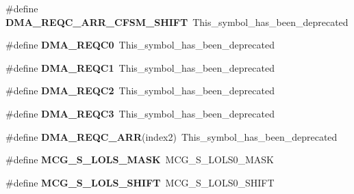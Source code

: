 \begin{DoxyCompactItemize}
\#define {\bfseries D\+M\+A\+\_\+\+R\+E\+Q\+C\+\_\+\+A\+R\+R\+\_\+\+C\+F\+S\+M\+\_\+\+S\+H\+I\+FT}~This\+\_\+symbol\+\_\+has\+\_\+been\+\_\+deprecated
\item 
\mbox{\label{group___backward___compatibility___symbols_ga734643acca0a28e7a07dc8c705fbc1f8}} 
\#define {\bfseries D\+M\+A\+\_\+\+R\+E\+Q\+C0}~This\+\_\+symbol\+\_\+has\+\_\+been\+\_\+deprecated
\item 
\mbox{\label{group___backward___compatibility___symbols_gadfccb3dbbd2bc4fc89afd35a2743d074}} 
\#define {\bfseries D\+M\+A\+\_\+\+R\+E\+Q\+C1}~This\+\_\+symbol\+\_\+has\+\_\+been\+\_\+deprecated
\item 
\mbox{\label{group___backward___compatibility___symbols_ga49eb3e3e2e8e2323ffcc73e88075672f}} 
\#define {\bfseries D\+M\+A\+\_\+\+R\+E\+Q\+C2}~This\+\_\+symbol\+\_\+has\+\_\+been\+\_\+deprecated
\item 
\mbox{\label{group___backward___compatibility___symbols_ga9fe628acf4e42637941f92c2886494b8}} 
\#define {\bfseries D\+M\+A\+\_\+\+R\+E\+Q\+C3}~This\+\_\+symbol\+\_\+has\+\_\+been\+\_\+deprecated
\item 
\mbox{\label{group___backward___compatibility___symbols_gaa78b620eb41bc2962c477844e4039b67}} 
\#define {\bfseries D\+M\+A\+\_\+\+R\+E\+Q\+C\+\_\+\+A\+RR}(index2)~This\+\_\+symbol\+\_\+has\+\_\+been\+\_\+deprecated
\item 
\mbox{\label{group___backward___compatibility___symbols_ga247a34b938aaa44d22f5cd4f56d95987}} 
\#define {\bfseries M\+C\+G\+\_\+\+S\+\_\+\+L\+O\+L\+S\+\_\+\+M\+A\+SK}~M\+C\+G\+\_\+\+S\+\_\+\+L\+O\+L\+S0\+\_\+\+M\+A\+SK
\item 
\mbox{\label{group___backward___compatibility___symbols_gae1d3f34b04899a885dcbd465e5154191}} 
\#define {\bfseries M\+C\+G\+\_\+\+S\+\_\+\+L\+O\+L\+S\+\_\+\+S\+H\+I\+FT}~M\+C\+G\+\_\+\+S\+\_\+\+L\+O\+L\+S0\+\_\+\+S\+H\+I\+FT
\item 
\mbox{\label{group___backward___compatibility___symbols_ga1a81d18d9f76e9b66fe0959cf2a1f917}} 

\end{DoxyCompactItemize}
